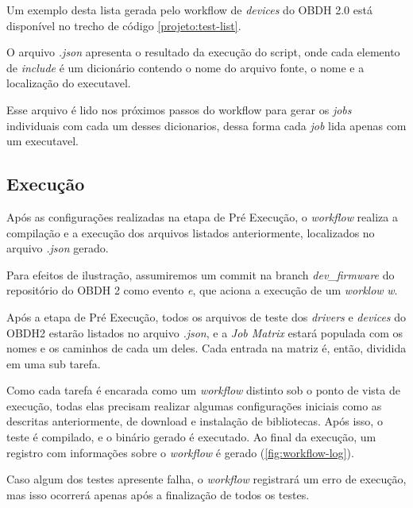             Um exemplo desta lista gerada pelo workflow de \textit{devices} do OBDH 2.0 está disponível no trecho de código \autoref{projeto:test-list}.
            
            
        
            O arquivo \textit{.json} apresenta o resultado da execução do script, onde cada elemento de \textit{include} é um dicionário contendo o nome do arquivo fonte, o nome e a localização do executavel.
            
            Esse arquivo é lido nos próximos passos do workflow para gerar os \textit{jobs} individuais com cada um desses dicionarios, dessa forma cada \textit{job} lida apenas com um executavel.
            
        \subsection{Execução}
        \label{projeto:exec}
            Após as configurações realizadas na etapa de Pré Execução, o \textit{workflow} realiza a compilação e a execução dos arquivos listados anteriormente, localizados no arquivo \textit{.json} gerado.
            
            Para efeitos de ilustração, assumiremos um commit na branch \textit{dev\_firmware} do repositório do OBDH 2 como evento \textit{e}, que aciona a execução de um \textit{worklow} \textit{w}.
            
            Após a etapa de Pré Execução, todos os arquivos de teste dos \textit{drivers} e \textit{devices} do OBDH2 estarão listados no arquivo \textit{.json}, e a \textit{Job Matrix} estará populada com os nomes e os caminhos de cada um deles. Cada entrada na matriz é, então, dividida em uma sub tarefa.
            
            Como cada tarefa é encarada como um \textit{workflow} distinto sob o ponto de vista de execução, todas elas precisam realizar algumas configurações iniciais como as descritas anteriormente, de download e instalação de bibliotecas. Após isso, o teste é compilado, e o binário gerado é executado. Ao final da execução, um registro com informações sobre o \textit{workflow} é gerado (\autoref{fig:workflow-log}).
            
            Caso algum dos testes apresente falha, o \textit{workflow} registrará um erro de execução, mas isso ocorrerá apenas após a finalização de todos os testes.
            
